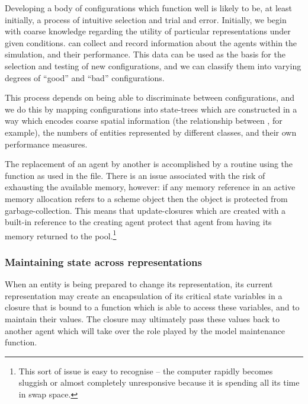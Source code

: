 Developing a body of configurations which function well is likely to
be, at least initially, a process of intuitive selection and trial and
error. Initially, we begin with coarse knowledge regarding the utility
of particular representations under given conditions. \mloggers can
collect and record information about the agents within the simulation,
and their performance. This data can be used as the basis for the
selection and testing of new configurations, and we can classify them
into varying degrees of ``good'' and ``bad'' configurations.

This process depends on being able to discriminate between
configurations, and we do this by mapping configurations into
state-trees which are constructed in a way which encodes coarse
spatial information (the relationship between \mpatches, for example),
the numbers of entities represented by different classes, and their
own performance measures.

The replacement of an agent by another is accomplished by a routine
using the  function as used in
the  file. There is an issue associated with
the risk of exhausting the available memory, however: if any memory
reference in an active memory allocation refers to a scheme object
then the object is protected from garbage-collection.  This means that
update-closures which are created with a built-in reference to the
creating agent protect that agent from having its memory returned to
the pool.\footnote{This sort of issue is easy to recognise -- the
computer rapidly becomes sluggish or almost completely unresponsive
because it is spending all its time in swap space.}

\subsubsection{Maintaining state across representations}

When an entity is being prepared to change its representation, its
current representation may create an encapsulation of its critical
state variables in a closure that is bound to a function which is able
to access these variables, and to maintain their values. The closure
may ultimately pass these values back to another agent which will take
over the role played by the model maintenance function.

